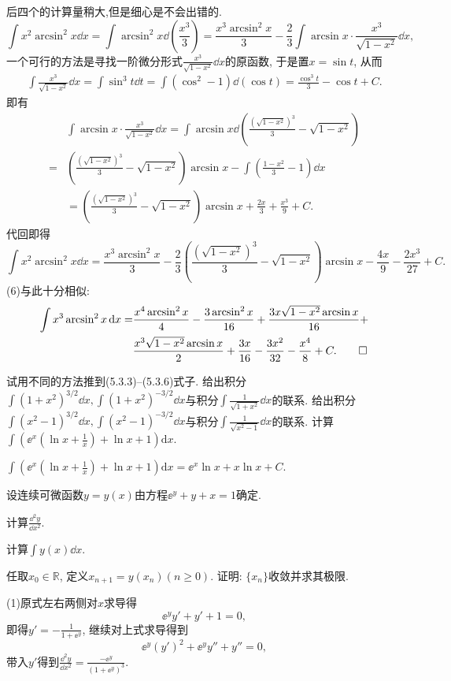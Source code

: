 \begin{quiza}
\begin{solution}
后四个的计算量稍大,但是细心是不会出错的. \[\int x^2\arcsin^2 x\dd x=\int\arcsin^2x\dd\left(\frac{x^3}{3}\right)=\frac{x^3\arcsin^2x}{3}-\frac{2}{3}\int\arcsin x\cdot\frac{x^3}{\sqrt{1-x^2}}\dd x,\]一个可行的方法是寻找一阶微分形式\(\frac{x^3}{\sqrt{1-x^2}}\dd x\)的原函数, 于是置\(x=\sin t\), 从而\[\begin{split}
\int\frac{x^3}{\sqrt{1-x^2}}\dd x=\int\sin^3t\dd t=\int\left(\cos^2-1\right)\dd\left(\cos t\right)=\frac{\cos^3t}{3}-\cos t+C.
\end{split}\]即有\[\begin{split}
&\int\arcsin x\cdot\frac{x^3}{\sqrt{1-x^2}}\dd x=\int\arcsin x\dd\left(\frac{\left(\sqrt{1-x^2}\right)^3}{3}-\sqrt{1-x^2}\right)\\=&\left(\frac{\left(\sqrt{1-x^2}\right)^3}{3}-\sqrt{1-x^2}\right)\arcsin x-\int\left(\frac{1-x^2}{3}-1\right)\dd x\\&=\left(\frac{\left(\sqrt{1-x^2}\right)^3}{3}-\sqrt{1-x^2}\right)\arcsin x+\frac{2x}{3}+\frac{x^3}{9}+C.
\end{split}\]代回即得\[\int x^2\arcsin^2 x\dd x=\frac{x^3\arcsin^2x}{3}-\frac{2}{3}\left(\frac{\left(\sqrt{1-x^2}\right)^3}{3}-\sqrt{1-x^2}\right)\arcsin x-\frac{4x}{9}-\frac{2x^3}{27}+C.\](6)与此十分相似:
\[\begin{split}
\int x^3\arcsin^2x\,\mathrm{d} x=&\frac{x^4\arcsin^2x}{4}-\frac{3\arcsin^2x}{16}+\frac{3x\sqrt{1-x^2}\arcsin x}{16}+\\&\frac{x^3\sqrt{1-x^2}\arcsin x}{2}+\frac{3x}{16}-\frac{3x^2}{32}-\frac{x^4}{8}+C.\qedhere
\end{split}\]
\end{solution}
\woe 试用不同的方法推到(5.3.3)--(5.3.6)式子.
\woe 给出积分\(\int\left(1+x^2\right)^{3/2}\dd x,\int\left(1+x^2\right)^{-3/2}\dd x\)与积分\(\int\frac{1}{\sqrt{1+x^2}}\dd x\)的联系.
\woe 给出积分\(\int\left(x^2-1\right)^{3/2}\dd x,\int\left(x^2-1\right)^{-3/2}\dd x\)与积分\(\int\frac{1}{\sqrt{x^2-1}}\dd x\)的联系.
\woe 计算\(\int\left(\ee^{x}\left(\ln x+\frac{1}{x}\right)+\ln x+1\right)\mathrm{d}x.\)
\begin{solution}
\(\int\left(\ee^{x}\left(\ln x+\frac{1}{x}\right)+\ln x+1\right)\mathrm{d}x=\ee^{x}\ln x+x\ln x+C.\)
\end{solution}
\woe 设连续可微函数\(y=y(x)\)由方程\(\ee^{y}+y+x=1\)确定.
\begin{quizs}
\item 计算\(\frac{\dd^2y}{\dd x^2}\).
\item 计算\(\int y(x)\dd x\).
\item 任取\(x_0\in\mathbb{R}\), 定义\(x_{n+1}=y(x_n)(n\geqslant 0)\). 证明: \(\{x_n\}\)收敛并求其极限.
\end{quizs}
\begin{solution}
(1)原式左右两侧对\(x\)求导得\[\ee^yy'+y'+1=0,\]即得\(y'=-\frac{1}{1+\ee^y}\), 继续对上式求导得到\[\ee^y(y')^2+\ee^yy''+y''=0,\] 带入\(y'\)得到\(\frac{\dd^2y}{\dd x^2}=\frac{-\ee^y}{(1+\ee^y)^3}\).


\end{solution}
\end{quiza}
